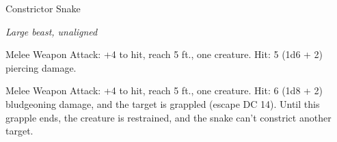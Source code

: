 \begin{monsterbox}{Constrictor Snake}
\begin{hangingpar}
\textit{Large beast, unaligned}
\end{hangingpar}
\dndline%
\basics[%
armorclass = 12,
hitpoints = 2d10 + 2,
speed = {30 ft., swim 30 ft.}
]
\dndline%
\stats[%
STR = \stat{15},
DEX = \stat{14},
CON = \stat{12},
INT = \stat{1},
WIS = \stat{10},
CHA = \stat{3}
]
\dndline%
\details[%
skills={},
damageimmunities={},
savingthrows={},
conditionimmunities={},
damageresistances={},
damagevulnerabilities={},
senses={blindsight 10 ft., passive Perception 10},
challenge=1/4
]
\dndline%
\begin{monsteraction}[Bite]
Melee Weapon Attack: +4 to hit, reach 5 ft., one creature. Hit: 5 (1d6 + 2) piercing damage.
\end{monsteraction}
\begin{monsteraction}[Constrict]
Melee Weapon Attack: +4 to hit, reach 5 ft., one creature. Hit: 6 (1d8 + 2) bludgeoning damage, and the target is grappled (escape DC 14). Until this grapple ends, the creature is restrained, and the snake can't constrict another target.
\end{monsteraction}
\end{monsterbox}